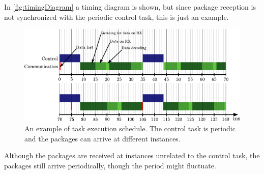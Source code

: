 In \autoref{fig:timingDiagram} a timing diagram is shown, but since package reception is not synchronized with the periodic control task, this is just an example.

\begin{figure}[H]
    \flushleft
    \includegraphics[width =.95\textwidth]{figures/timingDiagram}	
    \caption{An example of task execution schedule. The control task is periodic and the packages can arrive at different instances.} 
    \label{fig:timingDiagram}
\end{figure}

Although the packages are received at instances unrelated to the control task, the packages still arrive periodically, though the period might fluctuate.